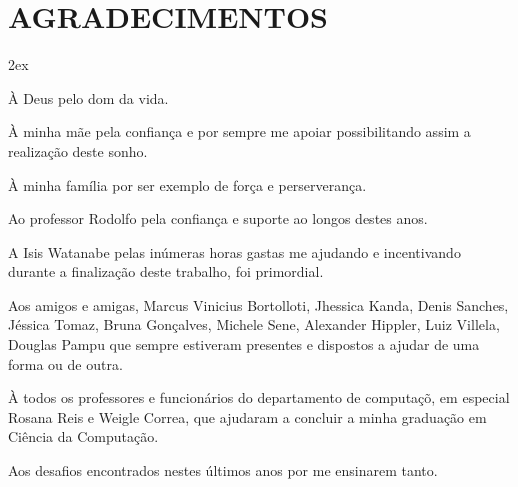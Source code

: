 \chapter*{AGRADECIMENTOS}
\begin{trivlist}  \itemsep 2ex  \normalsize
	\item \`{A} Deus pelo dom da vida.
        \item \`{A} minha m\~{a}e pela confian\c{c}a e por sempre me apoiar possibilitando assim a realiza\c{c}\~ao deste sonho.
        \item \`{A} minha fam\'{i}lia por ser exemplo de for\c{c}a e perserveran\c{c}a.
        \item Ao professor Rodolfo pela confian\c{c}a e suporte ao longos destes anos.
        \item A Isis Watanabe pelas in\'{u}meras horas gastas me ajudando e incentivando durante a finaliza\c{c}\~ao deste trabalho, foi primordial.
	\item Aos amigos e amigas, Marcus Vinicius Bortolloti, Jhessica Kanda, Denis Sanches, J\'{e}ssica Tomaz, Bruna Gon\c{c}alves, Michele Sene, 
	      Alexander Hippler, Luiz Villela, Douglas Pampu que sempre estiveram presentes e dispostos a ajudar de uma forma ou de outra.
        \item \`{A} todos os professores e funcion\'{a}rios do departamento de computa\c{c}\~o, em especial Rosana Reis e Weigle Correa, que ajudaram a 
		concluir a minha gradua\c{c}\~ao em Ci\^{e}ncia da Computa\c{c}\~{a}o.
	\item Aos desafios encontrados nestes \'{u}ltimos anos por me ensinarem tanto.
\end{trivlist}
